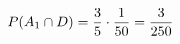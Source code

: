 \documentclass[preview]{standalone}
\begin{document}
\begin{align*}
\special{dvisvgm:raw <g id='unique000'>}P(A_1\cap D)=\frac35\cdot\frac1{50}=\frac3{250}\special{dvisvgm:raw </g>}
\end{align*}
\end{document}
